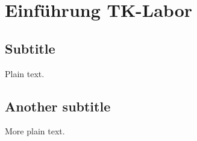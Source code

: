 \section{Einführung TK-Labor}

\subsection{Subtitle}

Plain text.

\subsection{Another subtitle}

More plain text.